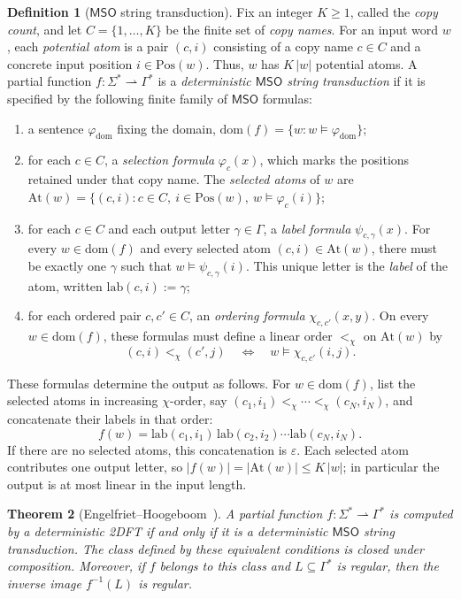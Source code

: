 \documentclass[11pt]{article}
\newtheorem{theorem}{Theorem}[section]
\theoremstyle{definition}
\newtheorem{definition}[theorem]{Definition}
\newcommand{\MSO}{\mathsf{MSO}}
\begin{document}
\begin{definition}[$\MSO$ string transduction]\label{def:mso-transduction}
Fix an integer $K\ge 1$, called the \emph{copy count}, and let
$C=\{1,\ldots,K\}$ be the finite set of \emph{copy names}.  For an input word
$w$, each \emph{potential atom} is a pair $(c,i)$ consisting of a copy name
$c\in C$ and a concrete input position
$i\in\mathrm{Pos}(w)$.  Thus, $w$ has $K\,|w|$ potential atoms.  A partial function
$f\colon\Sigma^*\rightharpoonup\Gamma^*$ is a \emph{deterministic $\MSO$
string transduction} if it is specified by the following finite family of
$\MSO$ formulas:
\begin{enumerate}[label=(\roman*)]
\item a sentence $\varphi_{\mathrm{dom}}$ fixing the domain,
$\mathrm{dom}(f)=\{w:w\models\varphi_{\mathrm{dom}}\}$;
\item for each $c\in C$, a \emph{selection formula} $\varphi_c(x)$, which marks
the positions retained under that copy name.  The \emph{selected atoms} of $w$ are $\mathrm{At}(w)=
  \{(c,i):c\in C,\ i\in\mathrm{Pos}(w),\
                 w\models\varphi_c(i)\}$;
\item for each $c\in C$ and each output letter $\gamma\in\Gamma$, a
\emph{label formula} $\psi_{c,\gamma}(x)$.  For every
$w\in\mathrm{dom}(f)$ and every selected atom $(c,i)\in\mathrm{At}(w)$, there
must be exactly one $\gamma$ such that $w\models\psi_{c,\gamma}(i)$.  This
unique letter is the \emph{label} of the atom, written
$\mathrm{lab}(c,i):=\gamma$;
\item for each ordered pair $c,c'\in C$, an \emph{ordering formula}
$\chi_{c,c'}(x,y)$.  On every $w\in\mathrm{dom}(f)$, these formulas must
define a linear order $<_\chi$ on $\mathrm{At}(w)$ by
\[
   (c,i)<_\chi(c',j)
   \quad\Longleftrightarrow\quad
   w\models\chi_{c,c'}(i,j).
\]
\end{enumerate}
These formulas determine the output as follows.  For $w\in\mathrm{dom}(f)$,
list the selected atoms in increasing $\chi$-order, say
$(c_1,i_1)<_\chi\cdots<_\chi(c_N,i_N)$, and concatenate their labels in that
order:
\[
   f(w)=\mathrm{lab}(c_1,i_1)\,\mathrm{lab}(c_2,i_2)\cdots\mathrm{lab}(c_N,i_N).
\]
If there are no selected atoms, this concatenation is $\varepsilon$.
Each selected atom contributes one output letter, so
$|f(w)|=|\mathrm{At}(w)|\le K\,|w|$; in particular the output is at most linear
in the input length.
\end{definition}

\begin{theorem}[Engelfriet--Hoogeboom~\cite{EngelfrietHoogeboom2001}]
\label{thm:eh}
A partial function $f\colon\Sigma^*\rightharpoonup\Gamma^*$ is computed by a
deterministic 2DFT if and only if it is a deterministic $\MSO$ string
transduction.  The class defined by these equivalent conditions is closed
under composition.  Moreover, if $f$ belongs to this class and
$L\subseteq\Gamma^*$ is regular, then the inverse image $f^{-1}(L)$ is regular.
\end{theorem}
\end{document}
